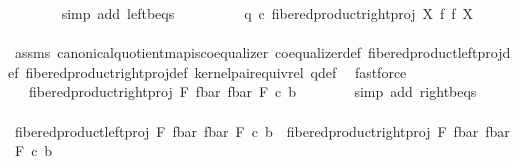 \begin{isabellebody}
\ \ \ \ \ \ \isamarkupfalse%
\ {\isacharparenleft}{\kern0pt}simp\ add{\isacharcolon}{\kern0pt}\ left{\isacharunderscore}{\kern0pt}b{\isacharunderscore}{\kern0pt}eqs{\isacharparenright}{\kern0pt}\isanewline
\ \ \ \ \isamarkupfalse%
\ \isamarkupfalse%
\ {\isachardoublequoteopen}{\isachardot}{\kern0pt}{\isachardot}{\kern0pt}{\isachardot}{\kern0pt}\ {\isacharequal}{\kern0pt}\ q\ {\isasymcirc}\isactrlsub c\ fibered{\isacharunderscore}{\kern0pt}product{\isacharunderscore}{\kern0pt}right{\isacharunderscore}{\kern0pt}proj\ X\ f\ f\ X{\isachardoublequoteclose}\isanewline
\ \ \ \ \ \ \isamarkupfalse%
\ assms{\isacharparenleft}{\kern0pt}{}{\isacharparenright}{\kern0pt}\ canonical{\isacharunderscore}{\kern0pt}quotient{\isacharunderscore}{\kern0pt}map{\isacharunderscore}{\kern0pt}is{\isacharunderscore}{\kern0pt}coequalizer\ coequalizer{\isacharunderscore}{\kern0pt}def\ fibered{\isacharunderscore}{\kern0pt}product{\isacharunderscore}{\kern0pt}left{\isacharunderscore}{\kern0pt}proj{\isacharunderscore}{\kern0pt}def\ fibered{\isacharunderscore}{\kern0pt}product{\isacharunderscore}{\kern0pt}right{\isacharunderscore}{\kern0pt}proj{\isacharunderscore}{\kern0pt}def\ kernel{\isacharunderscore}{\kern0pt}pair{\isacharunderscore}{\kern0pt}equiv{\isacharunderscore}{\kern0pt}rel\ q{\isacharunderscore}{\kern0pt}def\ \isamarkupfalse%
\ fastforce\isanewline
\ \ \ \ \isamarkupfalse%
\ \isamarkupfalse%
\ {\isachardoublequoteopen}{\isachardot}{\kern0pt}{\isachardot}{\kern0pt}{\isachardot}{\kern0pt}\ {\isacharequal}{\kern0pt}\ fibered{\isacharunderscore}{\kern0pt}product{\isacharunderscore}{\kern0pt}right{\isacharunderscore}{\kern0pt}proj\ F\ {\isacharparenleft}{\kern0pt}f{\isacharunderscore}{\kern0pt}bar{\isacharparenright}{\kern0pt}\ {\isacharparenleft}{\kern0pt}f{\isacharunderscore}{\kern0pt}bar{\isacharparenright}{\kern0pt}\ F\ {\isasymcirc}\isactrlsub c\ b{\isachardoublequoteclose}\isanewline
\ \ \ \ \ \ \isamarkupfalse%
\ {\isacharparenleft}{\kern0pt}simp\ add{\isacharcolon}{\kern0pt}\ right{\isacharunderscore}{\kern0pt}b{\isacharunderscore}{\kern0pt}eqs{\isacharparenright}{\kern0pt}\isanewline
\ \ \ \ \isamarkupfalse%
\ \isamarkupfalse%
\ {\isachardoublequoteopen}fibered{\isacharunderscore}{\kern0pt}product{\isacharunderscore}{\kern0pt}left{\isacharunderscore}{\kern0pt}proj\ F\ {\isacharparenleft}{\kern0pt}f{\isacharunderscore}{\kern0pt}bar{\isacharparenright}{\kern0pt}\ {\isacharparenleft}{\kern0pt}f{\isacharunderscore}{\kern0pt}bar{\isacharparenright}{\kern0pt}\ F\ {\isasymcirc}\isactrlsub c\ b\ {\isacharequal}{\kern0pt}\ fibered{\isacharunderscore}{\kern0pt}product{\isacharunderscore}{\kern0pt}right{\isacharunderscore}{\kern0pt}proj\ F\ {\isacharparenleft}{\kern0pt}f{\isacharunderscore}{\kern0pt}bar{\isacharparenright}{\kern0pt}\ {\isacharparenleft}{\kern0pt}f{\isacharunderscore}{\kern0pt}bar{\isacharparenright}{\kern0pt}\ F\ {\isasymcirc}\isactrlsub c\ b{\isachardoublequoteclose}\isanewline

\end{isabellebody}
